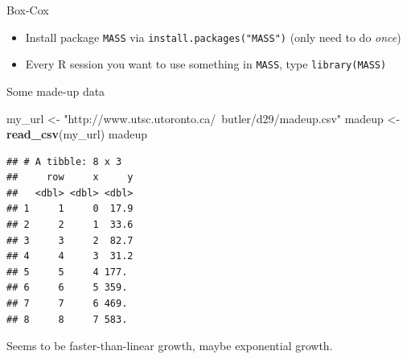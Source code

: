 \documentclass[ignorenonframetext,]{beamer}
\newenvironment{Shaded}{\begin{snugshade}}{\end{snugshade}}
\newcommand{\KeywordTok}[1]{\textcolor[rgb]{0.13,0.29,0.53}{\textbf{#1}}}
\newcommand{\NormalTok}[1]{#1}
\newcommand{\StringTok}[1]{\textcolor[rgb]{0.31,0.60,0.02}{#1}}
\begin{document}
\begin{frame}[fragile]{Box-Cox}
\protect\hypertarget{box-cox}{}

\begin{itemize}
\item
  Install package \texttt{MASS} via \texttt{install.packages("MASS")}
  (only need to do \emph{once})
\item
  Every R session you want to use something in \texttt{MASS}, type
  \texttt{library(MASS)}
\end{itemize}

\end{frame}

\begin{frame}[fragile]{Some made-up data}
\protect\hypertarget{some-made-up-data}{}

\begin{Shaded}
\begin{Highlighting}[]
\NormalTok{my_url <-}\StringTok{ "http://www.utsc.utoronto.ca/~butler/d29/madeup.csv"}
\NormalTok{madeup <-}\StringTok{ }\KeywordTok{read_csv}\NormalTok{(my_url)}
\NormalTok{madeup}
\end{Highlighting}
\end{Shaded}

\begin{verbatim}
## # A tibble: 8 x 3
##     row     x     y
##   <dbl> <dbl> <dbl>
## 1     1     0  17.9
## 2     2     1  33.6
## 3     3     2  82.7
## 4     4     3  31.2
## 5     5     4 177. 
## 6     6     5 359. 
## 7     7     6 469. 
## 8     8     7 583.
\end{verbatim}

Seems to be faster-than-linear growth, maybe exponential growth.

\end{frame}
\end{document}

